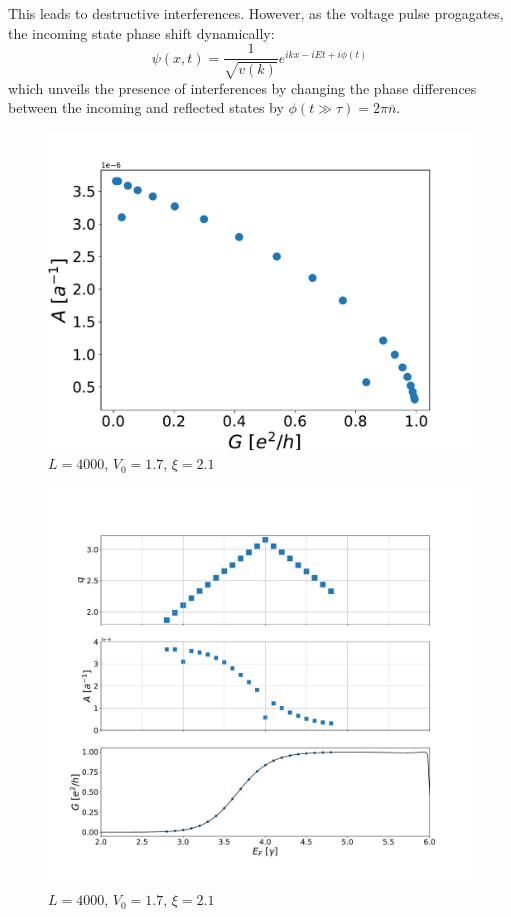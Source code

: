 \documentclass[aps,prl,preprint,groupedaddress]{revtex4-1}
\begin{document}
This leads to destructive interferences. However, as the voltage pulse progagates, the incoming state phase shift dynamically:
\begin{equation}
\psi(x,t) =  \frac{1}{\sqrt{v(k)}} e^{ikx - iEt + i\phi(t)}
\end{equation}
which unveils the presence of interferences by changing the phase differences between the incoming and reflected states by $\phi(t\gg \tau) = 2\pi \overline{n}$.


\begin{figure}
	\centering
	\includegraphics[width=0.7\linewidth]{../figures/plot_G_AMP_Q/plot_A_vs_G}
	\caption{$L =4000$, $V_0 = 1.7$, $\xi = 2.1$}
	\label{fig:a_vs_g}
\end{figure}
\begin{figure}
	\centering
	\includegraphics[width=0.7\linewidth]{../figures/plot_G_AMP_Q/plot_G_AMP_Q}
	\caption{$L =4000$, $V_0 = 1.7$, $\xi = 2.1$}
	\label{fig:A_vs_G}
\end{figure}
\end{document}

